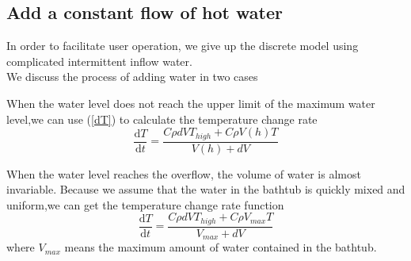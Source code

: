 \documentclass{mcmthesis}
\begin{document}
\subsection{Add a constant flow of hot water}
In order to facilitate user operation, we give up the discrete model using complicated intermittent inflow water.\\
\indent We discuss the process of adding water in two cases
\begin{itemize}
\item{
When the water level does not reach the upper limit of the maximum water level,we can use (\ref{dT}) to calculate the temperature change rate
\begin{equation}
	\frac{\mathrm{d} T}{\mathrm{d} t}=\frac{C\rho dVT_{high}+C\rho V(h)T}{V(h)+dV}
\label{dT}
\end{equation}
\item{
	When the water level reaches the overflow, the volume of water is almost invariable. Because we assume that the water in the bathtub is quickly mixed and uniform,we can get the temperature change rate function
	\begin{equation}
	\frac{\mathrm{d} T}{\mathrm{d} t}=\frac{C\rho dVT_{high}+C\rho V_{max}T}{V_{max}+dV}
	\label{dT}
	\end{equation}
	where $V_{max}$ means the maximum amount of water contained in the bathtub.
}
}
\end{itemize}
\end{document}
